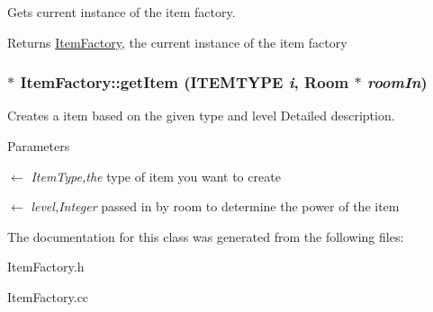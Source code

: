 Gets current instance of the item factory. \begin{DoxyReturn}{Returns}
\hyperlink{classItemFactory}{ItemFactory}, the current instance of the item factory 
\end{DoxyReturn}
\hypertarget{classItemFactory_a3309bc85cb53352b065333b0286b55d1}{
\subsubsection[{getItem}]{ $\ast$ ItemFactory::getItem (ITEMTYPE {\em i}, \/  {\bf Room} $\ast$ {\em roomIn})}}
\label{classItemFactory_a3309bc85cb53352b065333b0286b55d1}


Creates a item based on the given type and level Detailed description. 
\begin{DoxyParams}{Parameters}
\item[\mbox{$\leftarrow$} {\em ItemType,the}]type of item you want to create \item[\mbox{$\leftarrow$} {\em level,Integer}]passed in by room to determine the power of the item \end{DoxyParams}


The documentation for this class was generated from the following files:\begin{DoxyCompactItemize}
\item 
ItemFactory.h\item 
ItemFactory.cc\end{DoxyCompactItemize}

